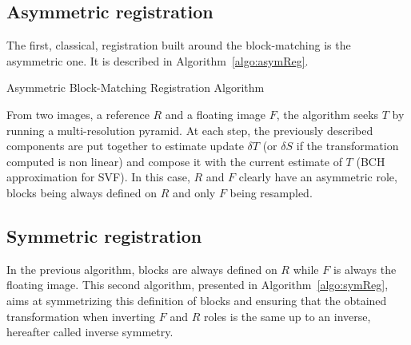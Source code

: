 \documentclass[a4paper]{article}
\begin{document}
\subsection{Asymmetric registration} %
\label{sub:asymmetric_registration}

The first, classical, registration built around the block-matching is the asymmetric one. It is described in Algorithm~\ref{algo:asymReg}.

\begin{algorithm}[!htbp]
\caption{Asymmetric Block-Matching Registration Algorithm}
\label{algo:asymReg}
\begin{algorithmic}[1]
    \ENDFOR
  \ENDFOR
\end{algorithmic}
\end{algorithm}
From two images, a reference $R$ and a floating image $F$, the algorithm seeks $T$ by running a multi-resolution pyramid. At each step, the previously described components are put together to estimate update $\delta T$ (or $\delta S$ if the transformation computed is non linear) and compose it with the current estimate of $T$ (BCH approximation for SVF). In this case, $R$ and $F$ clearly have an asymmetric role, blocks being always defined on $R$ and only $F$ being resampled.


\subsection{Symmetric registration} %
\label{sub:symmetric_registration}

In the previous algorithm, blocks are always defined on $R$ while $F$ is always the floating image. This second algorithm, presented in Algorithm~\ref{algo:symReg}, aims at symmetrizing this definition of blocks and ensuring that the obtained transformation when inverting $F$ and $R$ roles is the same up to an inverse, hereafter called inverse symmetry.
\end{document}

